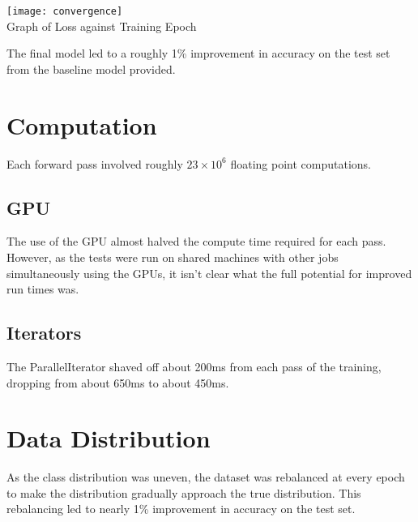 \documentclass{article}
\begin{document}
\begin{center}
\texttt{[image: convergence]}\\
Graph of Loss against Training Epoch
\end{center}
The final model led to a roughly 1\% improvement in accuracy on the test set from the baseline model provided.

\section{Computation}

Each forward pass involved roughly $23\times10^6$ floating point computations.

\subsection{GPU}
The use of the GPU almost halved the compute time required for each pass. However, as the tests were run on shared machines with other jobs simultaneously using the GPUs, it isn't clear what the full potential for improved run times was.

\subsection{Iterators}

The ParallelIterator shaved off about 200ms from each pass of the training, dropping from about 650ms to about 450ms.

\section{Data Distribution}

As the class distribution was uneven, the dataset was rebalanced at every epoch to make the distribution gradually approach the true distribution. 
This rebalancing led to nearly 1\% improvement in accuracy on the test set.
\end{document}
